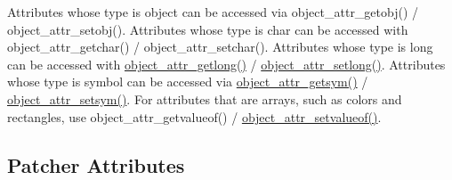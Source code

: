 Attributes whose type is object can be accessed via object\_\-attr\_\-getobj() / object\_\-attr\_\-setobj(). Attributes whose type is char can be accessed with object\_\-attr\_\-getchar() / object\_\-attr\_\-setchar(). Attributes whose type is long can be accessed with \hyperlink{group__attr_ga1179c4e91fb8263447ff4dfa471df953}{object\_\-attr\_\-getlong()} / \hyperlink{group__attr_ga986dd931f91666f178bdf3aace48f53b}{object\_\-attr\_\-setlong()}. Attributes whose type is symbol can be accessed via \hyperlink{group__attr_ga001b1ff245bf22db3fadabd61324d1e7}{object\_\-attr\_\-getsym()} / \hyperlink{group__attr_ga642c3b5686b08880194f74c0d5149bcf}{object\_\-attr\_\-setsym()}. For attributes that are arrays, such as colors and rectangles, use object\_\-attr\_\-getvalueof() / \hyperlink{group__attr_ga95163d72f6b7500e5986af0f23743e4f}{object\_\-attr\_\-setvalueof()}.\hypertarget{chapter_scripting_chapter_scripting_attrs_patcher}{}\subsection{Patcher Attributes}\label{chapter_scripting_chapter_scripting_attrs_patcher}
